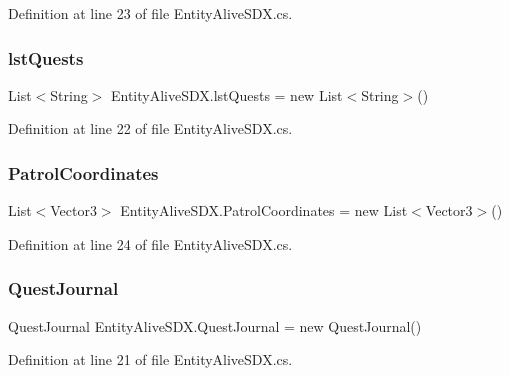 Definition at line 23 of file Entity\+Alive\+S\+D\+X.\+cs.

\mbox{\label{class_entity_alive_s_d_x_a42eb949271504f317942f9d6c94f0871}} 
\subsubsection{\texorpdfstring{lstQuests}{lstQuests}}
{\footnotesize\ttfamily List$<$String$>$ Entity\+Alive\+S\+D\+X.\+lst\+Quests = new List$<$String$>$()}



Definition at line 22 of file Entity\+Alive\+S\+D\+X.\+cs.

\mbox{\label{class_entity_alive_s_d_x_a0d943700c840fdf1128132467946bbcc}} 
\subsubsection{\texorpdfstring{PatrolCoordinates}{PatrolCoordinates}}
{\footnotesize\ttfamily List$<$Vector3$>$ Entity\+Alive\+S\+D\+X.\+Patrol\+Coordinates = new List$<$Vector3$>$()}



Definition at line 24 of file Entity\+Alive\+S\+D\+X.\+cs.

\mbox{\label{class_entity_alive_s_d_x_a3dae6ce1241c45fae4a065788ee6ac4f}} 
\subsubsection{\texorpdfstring{QuestJournal}{QuestJournal}}
{\footnotesize\ttfamily Quest\+Journal Entity\+Alive\+S\+D\+X.\+Quest\+Journal = new Quest\+Journal()}



Definition at line 21 of file Entity\+Alive\+S\+D\+X.\+cs.

\mbox{\label{class_entity_alive_s_d_x_ac910de3329b46a5766ec914b8cefc10a}} 
